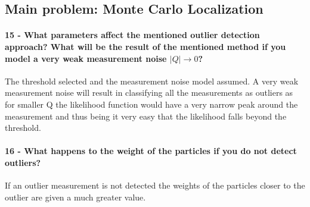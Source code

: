 \documentclass[12pt]{article}
\begin{document}
\subsection{Main problem: Monte Carlo Localization}

\paragraph{15 - What parameters affect the mentioned outlier detection approach? What will be the result of the mentioned method if you model a very weak measurement noise \(|Q| \to 0\)?}
The threshold selected and the measurement noise model assumed. A very weak measurement noise will result in classifying all the measurements as outliers as for smaller Q the likelihood function would have a very narrow peak around the measurement and thus being it very easy that the likelihood falls beyond the threshold.

\paragraph{16 - What happens to the weight of the particles if you do not detect outliers?}
If an outlier measurement is not detected the weights of the particles closer to the outlier are given a much greater value.
\end{document}
